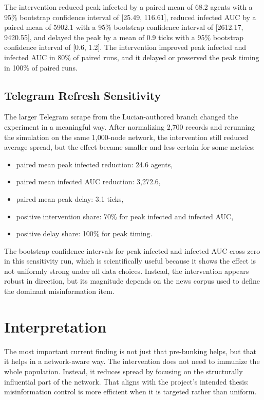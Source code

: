 \documentclass[11pt,a4paper]{article}
\begin{document}
The intervention reduced peak infected by a paired mean of 68.2 agents with a 95\% bootstrap confidence interval of [25.49, 116.61], reduced infected AUC by a paired mean of 5902.1 with a 95\% bootstrap confidence interval of [2612.17, 9420.55], and delayed the peak by a mean of 0.9 ticks with a 95\% bootstrap confidence interval of [0.6, 1.2]. The intervention improved peak infected and infected AUC in 80\% of paired runs, and it delayed or preserved the peak timing in 100\% of paired runs.

\subsection{Telegram Refresh Sensitivity}
The larger Telegram scrape from the Lucian-authored branch changed the experiment in a meaningful way. After normalizing 2,700 records and rerunning the simulation on the same 1,000-node network, the intervention still reduced average spread, but the effect became smaller and less certain for some metrics:

\begin{itemize}
  \item paired mean peak infected reduction: 24.6 agents,
  \item paired mean infected AUC reduction: 3,272.6,
  \item paired mean peak delay: 3.1 ticks,
  \item positive intervention share: 70\% for peak infected and infected AUC,
  \item positive delay share: 100\% for peak timing.
\end{itemize}

The bootstrap confidence intervals for peak infected and infected AUC cross zero in this sensitivity run, which is scientifically useful because it shows the effect is not uniformly strong under all data choices. Instead, the intervention appears robust in direction, but its magnitude depends on the news corpus used to define the dominant misinformation item.

\section{Interpretation}
The most important current finding is not just that pre-bunking helps, but that it helps in a network-aware way. The intervention does not need to immunize the whole population. Instead, it reduces spread by focusing on the structurally influential part of the network. That aligns with the project's intended thesis: misinformation control is more efficient when it is targeted rather than uniform.
\end{document}
